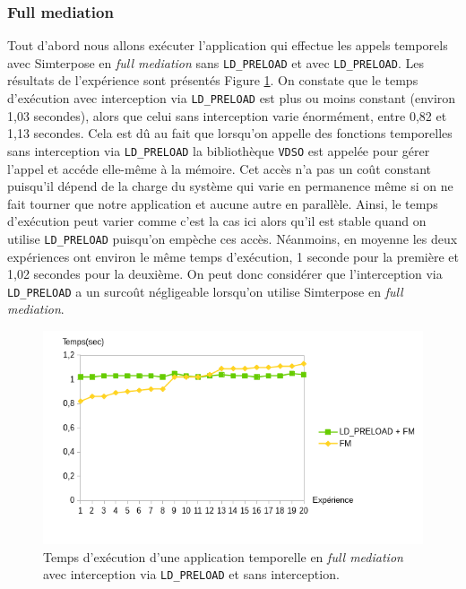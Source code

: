\subsubsection{Full mediation}
 Tout d'abord nous allons exécuter l'application qui effectue les appels temporels avec Simterpose en \textit{full mediation} sans \texttt{LD\_PRELOAD} et avec \texttt{LD\_PRELOAD}. Les résultats de l'expérience sont présentés Figure \ref{Temps_FM}. On constate que le temps d'exécution avec interception via \texttt{LD\_PRELOAD} est plus ou moins constant (environ 1,03 secondes), alors que celui sans interception varie énormément, entre 0,82 et 1,13 secondes. Cela est dû au fait que lorsqu'on appelle des fonctions temporelles sans interception via \texttt{LD\_PRELOAD} la bibliothèque \texttt{VDSO} est appelée pour gérer l'appel et accéde elle-même à la mémoire. Cet accès n'a pas un coût constant puisqu'il dépend de la charge du système qui varie en permanence même si on ne fait tourner que notre application et aucune autre en parallèle. Ainsi, le temps d'exécution peut varier comme c'est la cas ici alors qu'il est stable quand on utilise \texttt{LD\_PRELOAD} puisqu'on empèche ces accès. Néanmoins, en moyenne les deux expériences ont environ le même temps d'exécution, 1 seconde pour la première et 1,02 secondes pour la deuxième. On peut donc considérer que l'interception via \texttt{LD\_PRELOAD} a un surcoût négligeable lorsqu'on utilise Simterpose en \textit{full mediation}.

\begin{figure}[H]
  \centering
    \includegraphics[scale=0.80]{mesures/graph/Temps_FM.png}
    \caption[Temps d'exécution d'une application temporelle en \textit{full mediation}] {Temps d'exécution d'une application temporelle en \textit{full mediation} avec interception via \texttt{LD\_PRELOAD} et sans interception.}
    \label{Temps_FM}
\end{figure}


